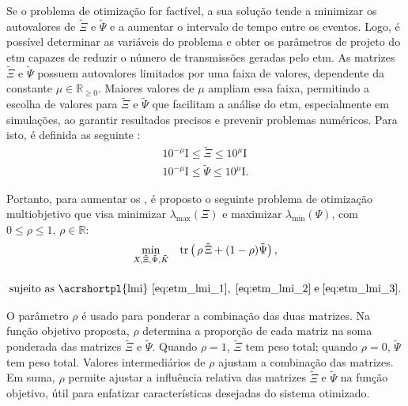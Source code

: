 Se o problema de otimização for factível, a sua solução tende a minimizar os autovalores de $\tilde{\Xi}$ e $\tilde{\Psi}$ e a aumentar o intervalo de tempo entre os eventos. Logo, é possível determinar as variáveis do problema e obter os parâmetros de projeto do \acrshort{etm} capazes de reduzir o número de transmissões geradas pelo \acrshort{etm}.
As matrizes $\tilde{\Xi}$ e $\tilde{\Psi}$ possuem autovalores limitados por uma faixa de valores, dependente da constante $\mu \in \mathbb{R}_{\geq 0}$. Maiores valores de $\mu$ ampliam essa faixa, permitindo a escolha de valores para $\tilde{\Xi}$ e $\tilde{\Psi}$ que facilitam a análise do \acrshort{etm}, especialmente em simulações, ao garantir resultados precisos e prevenir problemas numéricos. Para isto, é definida as seguinte : \begin{gather}
  10^{-\mu} \mathrm{I} \leq \tilde{\Xi} \leq 10^{\mu} \mathrm{I} \label{eq:etm_lmi_2}\\
  10^{-\mu} \mathrm{I} \leq \tilde{\Psi} \leq 10^{\mu} \mathrm{I} \label{eq:etm_lmi_3}.
\end{gather}

Portanto, para aumentar os , é proposto o seguinte problema de otimização multiobjetivo que visa minimizar $\lambda_{\max} (\Xi)$ e maximizar $\lambda_{\min}(\Psi)$, com $0 \leq \rho \leq 1, \, \rho \in \mathbb{R}$: \begin{gather}\underset{X, \tilde{\Xi}, \tilde{\Psi}, \tilde{K}}\min \quad \mathrm{tr}\left(\,\rho \, \tilde{\Xi} + (1 - \rho)\tilde{\Psi}\right), \\[12pt] \textrm{sujeito as \acrshortpl{lmi} } \eqref{eq:etm_lmi_1}, \hspace{0.1cm} \eqref{eq:etm_lmi_2} \hspace{0.1cm} \mathrm{e} \hspace{0.1cm} \eqref{eq:etm_lmi_3}. \notag \label{eq:optimization_problem}\end{gather} 

O parâmetro $\rho$ é usado para ponderar a combinação das duas matrizes. Na função objetivo proposta, $\rho$ determina a proporção de cada matriz na soma ponderada das matrizes $\tilde{\Xi}$ e $\tilde{\Psi}$. Quando $\rho = 1$, $\tilde{\Xi}$ tem peso total; quando $\rho = 0$, $\tilde{\Psi}$ tem peso total. Valores intermediários de $\rho$ ajustam a combinação das matrizes. Em suma, $\rho$ permite ajustar a influência relativa das matrizes $\tilde{\Xi}$ e $\tilde{\Psi}$ na função objetivo, útil para enfatizar características desejadas do sistema otimizado.

